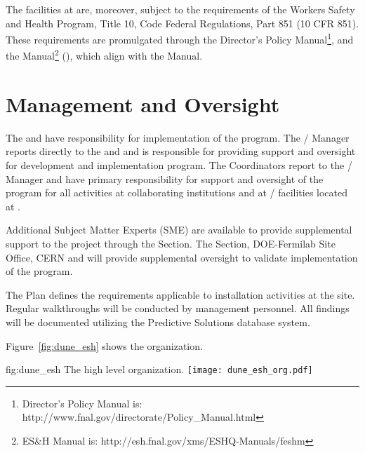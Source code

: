 The \fnal facilities at \surf are, moreover, subject to the requirements of the
 Workers Safety and Health Program, Title 10, Code Federal
Regulations, Part 851 (10 CFR 851). These requirements are
promulgated through the \fnal Director's Policy Manual\footnote{\fnal
  Director's Policy Manual is:
  http://www.fnal.gov/directorate/Policy\_Manual.html}, and the \fnal
{} Manual\footnote{\fnal ES\&H Manual is:
  http://esh.fnal.gov/xms/ESHQ-Manuals/feshm} (), which align with
the \surf {} Manual.


\section{  Management and Oversight}

The  and  have responsibility for
implementation of the   program.  The
/  Manager reports directly to the
 and  and is responsible for providing
 support and oversight for development and implementation
  program. The  
Coordinators report to the / 
Manager and have primary responsibility for  support and
oversight of the   program for all activities
at collaborating institutions and at /
facilities located at \surf.

Additional  Subject Matter Experts (SME) are available to provide
supplemental support to the project through the \fnal {}
Section. The \fnal {} Section, DOE-Fermilab Site Office, CERN and
\surf will provide supplemental  oversight to validate
implementation of the    program.

The   Plan 
defines the  requirements applicable to 
installation activities at the \surf site. Regular  walkthroughs
will be conducted by   management personnel. All
findings will be documented utilizing the \fnal Predictive
Solutions database system.

Figure~\ref{fig:dune_esh} shows the   organization.
\begin{dunefigure}{fig:dune_esh}
  {The high level   organization.}
  \texttt{[image: dune\_esh\_org.pdf]}
\end{dunefigure}




